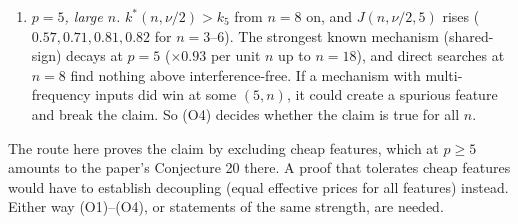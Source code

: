 \documentclass[11pt]{article}
\theoremstyle{definition}
\begin{document}
\begin{enumerate}
multi-feature product architecture the relevant single-feature quantity is the atom constant $k^\flat(n,s)<1$ (Corollary~\ref{cor:quad}, remark (d)),
and in the limit of high-degree tests the inequality (S$_p$) of Section~\ref{sec:arch}, item 4.
A partial rigorous fact towards the width conjecture: in class $\mathcal C$ a single feature of width $N\le n$ has
$\min_x\mathrm{cm}(\Phi)\le2^n\sin(\frac\pi{2p})\sum_i|\beta_i|$.  (Write $\Phi=\sum_i\overline{\beta_i}\prod_t(1+\overline{\xi_{it}}z_t)$ with $z_t\in\mu_p$, assign each atom a slot of its own,
and choose $z_t$ there as the root of unity nearest $-\xi_{it}$.  That factor is at most $2\sin(\pi/2p)$ and every other factor is at most $2$.)  So width below $\nu$
loses to the IF value once $2^n\sin(\pi/2p)<\nu^{1-s}$, i.e.\ for $p\gtrsim\pi2^{n-1}\nu^{s-1}$.  This says nothing at $p=5$.
\item[(O4)] \emph{$p=5$, large $n$.}  $k^*(n,\nu/2)>k_5$ from $n=8$ on, and $J(n,\nu/2,5)$ rises ($0.57,0.71,0.81,0.82$ for $n=3$--$6$).  The
strongest known mechanism (shared-sign) decays at $p=5$ ($\times0.93$ per unit $n$ up to $n=18$), and direct searches at $n=8$ find nothing
above interference-free.  If a mechanism with multi-frequency inputs did win at some $(5,n)$, it could create a spurious feature and
break the claim.  So (O4) decides whether the claim is true for all $n$.
\end{enumerate}
The route here proves the claim by excluding cheap features, which at $p\ge5$ amounts to the paper's Conjecture 20 there.  A proof
that tolerates cheap features would have to establish decoupling (equal effective prices for all features) instead.  Either way
(O1)--(O4), or statements of the same strength, are needed.
\end{document}
